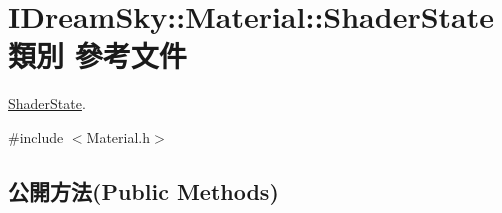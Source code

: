 \hypertarget{class_i_dream_sky_1_1_material_1_1_shader_state}{}\section{I\+Dream\+Sky\+:\+:Material\+:\+:Shader\+State 類別 參考文件}
\label{class_i_dream_sky_1_1_material_1_1_shader_state}


\hyperlink{class_i_dream_sky_1_1_material_1_1_shader_state}{Shader\+State}.  




{\ttfamily \#include $<$Material.\+h$>$}

\subsection*{公開方法(Public Methods)}
